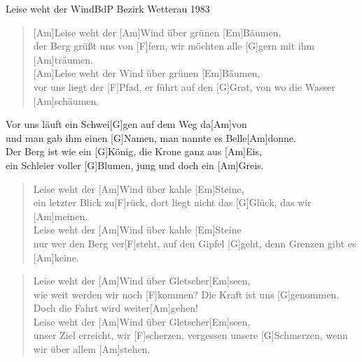 \begin{song}{Leise weht der Wind}{BdP Bezirk Wetterau 1983}

    \begin{verse}
        [Am]Leise weht der [Am]Wind über grünen [Em]Bäumen, \\
        der Berg grüßt uns von [F]fern, wir möchten alle [G]gern mit ihm [Am]träumen.\\

        [Am]Leise weht der Wind über grünen [Em]Bäumen, \\
        vor uns liegt der [F]Pfad, er führt auf den [G]Grat, von wo die Wasser [Am]schäumen.
    \end{verse}

    \begin{chorus}
        Vor uns läuft ein Schwei[G]gen auf dem Weg da[Am]von \\
        und man gab ihm einen [G]Namen, man nannte es Belle[Am]donne. \\

        Der Berg ist wie ein [G]König, die Krone ganz aus [Am]Eis, \\
        ein Schleier voller [G]Blumen, jung und doch ein [Am]Greis.
    \end{chorus}

    \begin{verse}  
        Leise weht der [Am]Wind über kahle [Em]Steine, \\
        ein letzter Blick zu[F]rück, dort liegt nicht das [G]Glück, das wir [Am]meinen. \\

        Leise weht der [Am]Wind über kahle [Em]Steine \\
        nur wer den Berg ver[F]steht, auf den Gipfel [G]geht, denn Grenzen gibt es [Am]keine.
    \end{verse}  


    \begin{verse}
        Leise weht der [Am]Wind über Gletscher[Em]seen, \\
        wie weit werden wir noch [F]kommen? Die Kraft ist uns [G]genommen. Doch die Fahrt wird weiter[Am]gehen! \\

        Leise weht der [Am]Wind über Gletscher[Em]seen,\\
        unser Ziel erreicht, wir [F]scherzen, vergessen unsere [G]Schmerzen, wenn wir über allem [Am]stehen. 
    \end{verse}  


\end{song}
